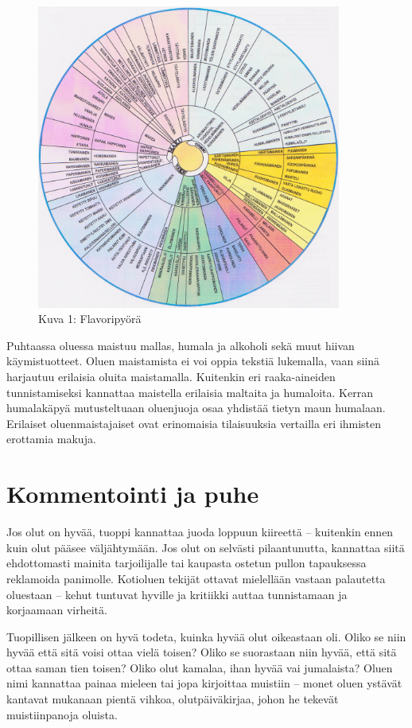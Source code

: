 \documentclass[a4paper,11pt]{report}
\begin{document}
\begin{figure}[t]
\centerline{
\includegraphics[width=10cm]{flavoripyoracropped.png}
}
\caption{Kuva 1: Flavoripyörä}
\end{figure}

Puhtaassa oluessa maistuu mallas, humala ja alkoholi sekä muut hiivan käymistuotteet. Oluen maistamista ei voi oppia tekstiä lukemalla, vaan siinä harjautuu erilaisia oluita maistamalla. Kuitenkin eri raaka-aineiden tunnistamiseksi kannattaa maistella erilaisia maltaita ja humaloita. Kerran humalakäpyä mutusteltuaan oluenjuoja osaa yhdistää tietyn maun humalaan. Erilaiset oluenmaistajaiset ovat erinomaisia tilaisuuksia vertailla eri ihmisten erottamia makuja.

\section{Kommentointi ja puhe}

Jos olut on hyvää, tuoppi kannattaa juoda loppuun kiireettä -- kuitenkin ennen kuin olut pääsee väljähtymään. Jos olut on selvästi pilaantunutta, kannattaa siitä ehdottomasti mainita tarjoilijalle tai kaupasta ostetun pullon tapauksessa reklamoida panimolle. Kotioluen tekijät ottavat mielellään vastaan palautetta oluestaan -- kehut tuntuvat hyville ja kritiikki auttaa tunnistamaan ja korjaamaan virheitä.

Tuopillisen jälkeen on hyvä todeta, kuinka hyvää olut oikeastaan oli. Oliko se niin hyvää että sitä voisi ottaa vielä toisen? Oliko se suorastaan niin hyvää, että sitä ottaa saman tien toisen? Oliko olut kamalaa, ihan hyvää vai jumalaista? Oluen nimi kannattaa painaa mieleen tai jopa kirjoittaa muistiin -- monet oluen ystävät kantavat mukanaan pientä vihkoa, olutpäiväkirjaa, johon he tekevät muistiinpanoja oluista.
\end{document}
